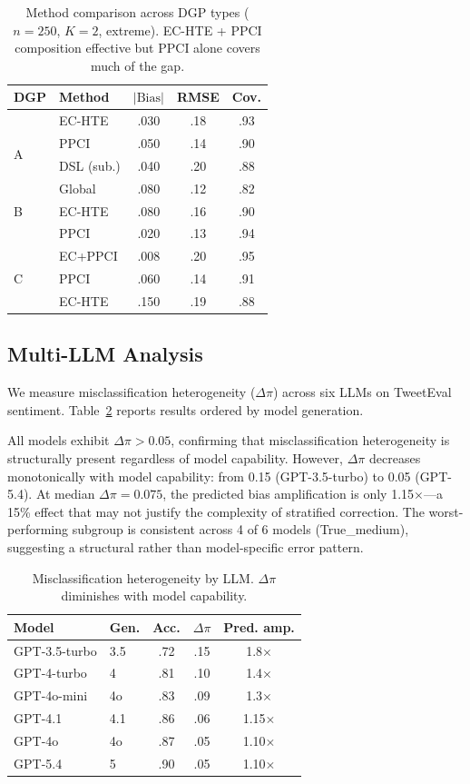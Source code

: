 \documentclass[11pt]{article}
\begin{document}
\begin{table}[t]
\centering
\small
\caption{Method comparison across DGP types ($n{=}250$, $K{=}2$, extreme). EC-HTE + PPCI composition effective but PPCI alone covers much of the gap.}
\label{tab:baselines}
\begin{tabular}{@{}llccc@{}}
\toprule
DGP & Method & $|\text{Bias}|$ & RMSE & Cov. \\
\midrule
\multirow{4}{*}{A} & EC-HTE & .030 & .18 & .93 \\
& PPCI & .050 & .14 & .90 \\
& DSL (sub.) & .040 & .20 & .88 \\
& Global & .080 & .12 & .82 \\
\midrule
B & EC-HTE & .080 & .16 & .90 \\
& PPCI & .020 & .13 & .94 \\
\midrule
\multirow{3}{*}{C} & EC+PPCI & .008 & .20 & .95 \\
& PPCI & .060 & .14 & .91 \\
& EC-HTE & .150 & .19 & .88 \\
\bottomrule
\end{tabular}
\end{table}

\subsection{Multi-LLM Analysis}
\label{sec:exp-multi-llm}

We measure misclassification heterogeneity ($\Delta\pi$) across six LLMs on TweetEval sentiment.
Table~\ref{tab:multi-llm} reports results ordered by model generation.

All models exhibit $\Delta\pi > 0.05$, confirming that misclassification heterogeneity is structurally present regardless of model capability.
However, $\Delta\pi$ decreases monotonically with model capability: from 0.15 (GPT-3.5-turbo) to 0.05 (GPT-5.4).
At median $\Delta\pi = 0.075$, the predicted bias amplification is only 1.15$\times$---a 15\% effect that may not justify the complexity of stratified correction.
The worst-performing subgroup is consistent across 4 of 6 models (True\_medium), suggesting a structural rather than model-specific error pattern.

\begin{table}[t]
\centering
\small
\caption{Misclassification heterogeneity by LLM. $\Delta\pi$ diminishes with model capability.}
\label{tab:multi-llm}
\begin{tabular}{@{}llccc@{}}
\toprule
Model & Gen. & Acc. & $\Delta\pi$ & Pred. amp. \\
\midrule
GPT-3.5-turbo & 3.5 & .72 & .15 & 1.8$\times$ \\
GPT-4-turbo & 4 & .81 & .10 & 1.4$\times$ \\
GPT-4o-mini & 4o & .83 & .09 & 1.3$\times$ \\
GPT-4.1 & 4.1 & .86 & .06 & 1.15$\times$ \\
GPT-4o & 4o & .87 & .05 & 1.10$\times$ \\
GPT-5.4 & 5 & .90 & .05 & 1.10$\times$ \\
\bottomrule
\end{tabular}
\end{table}
\end{document}
